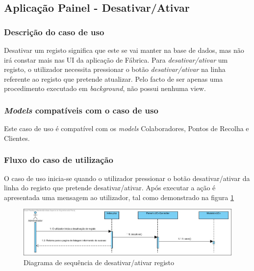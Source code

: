 \subsection{Aplicação Painel - Desativar/Ativar}
\subsubsection*{Descrição do caso de uso}
Desativar um registo significa que este se vai manter na base de dados, mas não irá constar mais nas UI da aplicação de Fábrica. Para \textit{desativar/ativar} um registo, o utilizador necessita pressionar o botão \textit{desativar/ativar} na linha referente ao registo que pretende atualizar. Pelo facto de ser apenas uma procedimento executado em \textit{background}, não possui nenhuma view.

\subsubsection*{\textit{Models} compatíveis com o caso de uso}
Este caso de uso é compatível com os \textit{models} Colaboradores, Pontos de Recolha e Clientes.

\subsubsection*{Fluxo do caso de utilização}
O caso de uso inicia-se quando o utilizador pressionar o botão desativar/ativar da linha do registo que pretende desativar/ativar. Após executar a ação é apresentada uma mensagem ao utilizador, tal como demonstrado na figura \ref{fig:sd_desativar}


\begin{figure}[H] 
	\begin{center}
		\includegraphics[width=\textwidth,keepaspectratio]{figuras/Diagramas_vp/SD_Painel_5_Desativar.jpg}
		\caption{Diagrama de sequência de desativar/ativar registo}
		\label{fig:sd_desativar} 
	\end{center}
\end{figure}